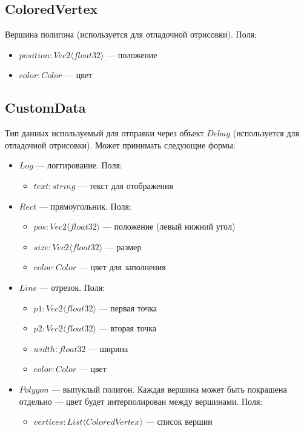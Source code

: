 \subsection{ColoredVertex}
Вершина полигона (используется для отладочной отрисовки). Поля:
\begin{itemize}
    \item $position : Vec2 \langle float32 \rangle$ --- положение
    \item $color : Color$ --- цвет
\end{itemize}

\subsection{CustomData}
Тип данных используемый для отправки через объект $Debug$ (используется для отладочной отрисовки).
Может принимать следующие формы:
\begin{itemize}
    \item $Log$ --- логгирование. Поля:
        \begin{itemize}
            \item $text : string$ --- текст для отображения
        \end{itemize}
    \item $Rect$ --- прямоугольник. Поля:
        \begin{itemize}
            \item $pos : Vec2 \langle float32 \rangle$ --- положение (левый нижний угол)
            \item $size : Vec2 \langle float32 \rangle$ --- размер
            \item $color : Color$ --- цвет для заполнения
        \end{itemize}
    \item $Line$ --- отрезок. Поля:
        \begin{itemize}
            \item $p1 : Vec2 \langle float32 \rangle$ --- первая точка
            \item $p2 : Vec2 \langle float32 \rangle$ --- вторая точка
            \item $width : float32$ --- ширина
            \item $color : Color$ --- цвет
        \end{itemize}
    \item $Polygon$ --- выпуклый полигон.
        Каждая вершина может быть покрашена отдельно --- цвет будет интерполирован между вершинами. Поля:
        \begin{itemize}
            \item $vertices : List \langle ColoredVertex \rangle$ --- список вершин
        \end{itemize}
\end{itemize}

